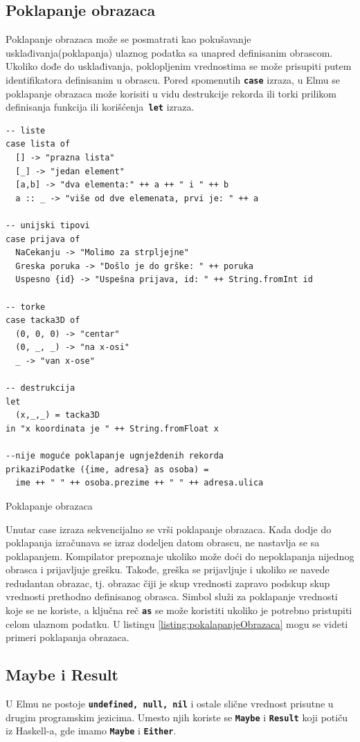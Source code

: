 \documentclass[12pt,oneside]{memoir}
\begin{document}
\subsection{Poklapanje obrazaca}
Poklapanje obrazaca može se posmatrati kao pokušavanje usklađivanja(poklapanja) ulaznog
podatka sa unapred definisanim obrascom. Ukoliko dođe do usklađivanja, poklopljenim
vrednostima se može prisupiti putem identifikatora definisanim u obrascu. Pored spomenutih
\texttt{\textbf{case}} izraza, u Elmu se poklapanje obrazaca može korisiti u vidu 
destrukcije rekorda ili torki prilikom definisanja funkcija ili korišćenja\texttt{\textbf{
let}} izraza.
\begin{listing}[h]
\begin{verbatim}
-- liste 
case lista of
  [] -> "prazna lista"
  [_] -> "jedan element"
  [a,b] -> "dva elementa:" ++ a ++ " i " ++ b
  a :: _ -> "više od dve elemenata, prvi je: " ++ a

-- unijski tipovi
case prijava of
  NaCekanju -> "Molimo za strpljejne"
  Greska poruka -> "Došlo je do grške: " ++ poruka
  Uspesno {id} -> "Uspešna prijava, id: " ++ String.fromInt id

-- torke
case tacka3D of
  (0, 0, 0) -> "centar"
  (0, _, _) -> "na x-osi"
  _ -> "van x-ose"

-- destrukcija
let
  (x,_,_) = tacka3D
in "x koordinata je " ++ String.fromFloat x

--nije moguće poklapanje ugnježdenih rekorda
prikaziPodatke ({ime, adresa} as osoba) =
  ime ++ " " ++ osoba.prezime ++ " " ++ adresa.ulica
\end{verbatim}
\caption{Poklapanje obrazaca}
\label{listing:pokalapanjeObrazaca}
\end{listing}

Unutar case izraza sekvencijalno se vrši poklapanje obrazaca. Kada dodje do poklapanja
izračunava se izraz dodeljen datom obrascu, ne nastavlja se sa poklapanjem. Kompilator
prepoznaje ukoliko može doći do nepoklapanja nijednog obrasca i prijavljuje grešku.
Takođe, greška se prijavljuje i ukoliko se navede redudantan obrazac, tj. obrazac čiji je
skup vrednosti zapravo podskup skup vrednosti prethodno definisanog obrasca. 
Simbol \texttt{\textbf{\textunderscore}} služi za poklapanje vrednosti koje se ne koriste,
a ključna reč \texttt{\textbf{as}} se može koristiti ukoliko je potrebno pristupiti celom
ulaznom podatku. U listingu \ref{listing:pokalapanjeObrazaca} mogu se videti primeri
poklapanja obrazaca.

\subsection{Maybe i Result}
U Elmu ne postoje \texttt{\textbf{undefined, null, nil}} i ostale slične vrednost prisutne
u drugim programskim jezicima. Umesto njih koriste se \texttt{\textbf{Maybe}} i
\texttt{\textbf{Result}} koji potiču iz Haskell-a, gde imamo \texttt{\textbf{Maybe}} i
\texttt{\textbf{Either}}.
\end{document}

